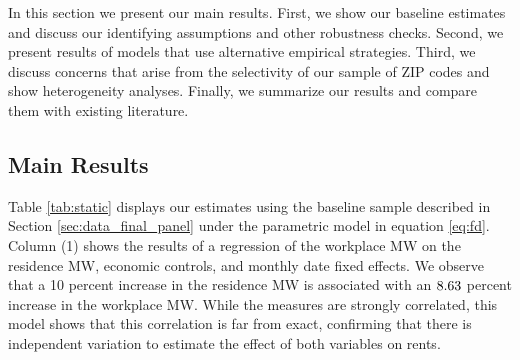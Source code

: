 
In this section we present our main results.
First, we show our baseline estimates and discuss our identifying assumptions
and other robustness checks.
Second, we present results of models that use alternative empirical strategies.
Third, we discuss concerns that arise from the selectivity of our sample of 
ZIP codes and show heterogeneity analyses. 
Finally, we summarize our results and compare them with existing literature.

\subsection{Main Results}
\label{sec:results_main}

Table \ref{tab:static} displays our estimates using the baseline sample 
described in Section \ref{sec:data_final_panel} under the parametric model
in equation \eqref{eq:fd}.
Column (1) shows the results of a regression of the workplace MW on the 
residence MW, economic controls, and monthly date fixed effects.
We observe that a 10 percent increase in the residence MW is associated with an
$\textnormal{8.63}$ percent increase in the workplace MW.
While the measures are strongly correlated, this model shows that this 
correlation is far from exact, confirming that there is independent variation
to estimate the effect of both variables on rents.


